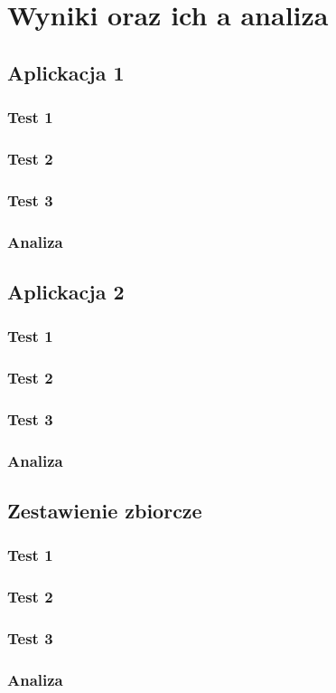 \chapter{Wyniki oraz ich a analiza}

\section{Aplickacja 1}
\subsection{Test 1}
\subsection{Test 2}
\subsection{Test 3}
\subsection{Analiza}

\section{Aplickacja 2}
\subsection{Test 1}
\subsection{Test 2}
\subsection{Test 3}
\subsection{Analiza}

\section{Zestawienie zbiorcze}
\subsection{Test 1}
\subsection{Test 2}
\subsection{Test 3}
\subsection{Analiza}


